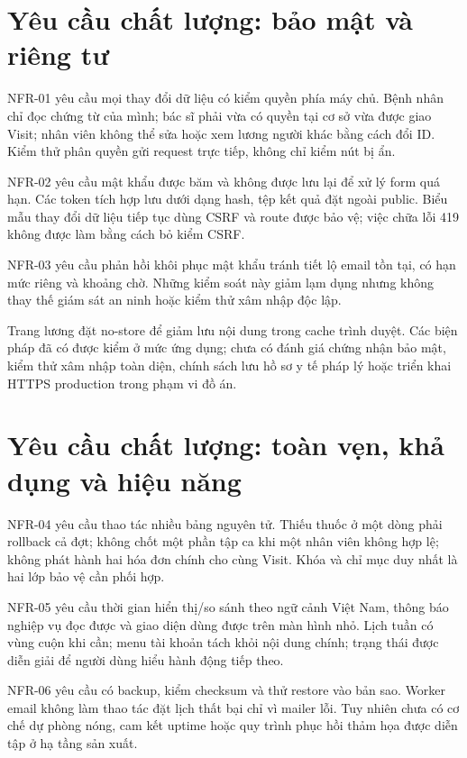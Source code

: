 \section{Yêu cầu chất lượng:\allowbreak{} bảo mật và riêng tư}
NFR-01 yêu cầu mọi thay đổi dữ liệu có kiểm quyền phía máy chủ.\allowbreak{} Bệnh nhân chỉ đọc chứng từ của mình; bác sĩ phải vừa có quyền tại cơ sở vừa được giao Visit; nhân viên không thể sửa hoặc xem lương người khác bằng cách đổi ID.\allowbreak{} Kiểm thử phân quyền gửi request trực tiếp, không chỉ kiểm nút bị ẩn.\allowbreak{}

NFR-02 yêu cầu mật khẩu được băm và không được lưu lại để xử lý form quá hạn.\allowbreak{} Các token tích hợp lưu dưới dạng hash, tệp kết quả đặt ngoài public.\allowbreak{} Biểu mẫu thay đổi dữ liệu tiếp tục dùng CSRF và route được bảo vệ; việc chữa lỗi 419 không được làm bằng cách bỏ kiểm CSRF.\allowbreak{}

NFR-03 yêu cầu phản hồi khôi phục mật khẩu tránh tiết lộ email tồn tại, có hạn mức riêng và khoảng chờ.\allowbreak{} Những kiểm soát này giảm lạm dụng nhưng không thay thế giám sát an ninh hoặc kiểm thử xâm nhập độc lập.\allowbreak{}

Trang lương đặt no-store để giảm lưu nội dung trong cache trình duyệt.\allowbreak{} Các biện pháp đã có được kiểm ở mức ứng dụng; chưa có đánh giá chứng nhận bảo mật, kiểm thử xâm nhập toàn diện, chính sách lưu hồ sơ y tế pháp lý hoặc triển khai HTTPS production trong phạm vi đồ án.\allowbreak{}


\section{Yêu cầu chất lượng:\allowbreak{} toàn vẹn, khả dụng và hiệu năng}
NFR-04 yêu cầu thao tác nhiều bảng nguyên tử.\allowbreak{} Thiếu thuốc ở một dòng phải rollback cả đợt; không chốt một phần tập ca khi một nhân viên không hợp lệ; không phát hành hai hóa đơn chính cho cùng Visit.\allowbreak{} Khóa và chỉ mục duy nhất là hai lớp bảo vệ cần phối hợp.\allowbreak{}

NFR-05 yêu cầu thời gian hiển thị/\allowbreak{}so sánh theo ngữ cảnh Việt Nam, thông báo nghiệp vụ đọc được và giao diện dùng được trên màn hình nhỏ.\allowbreak{} Lịch tuần có vùng cuộn khi cần; menu tài khoản tách khỏi nội dung chính; trạng thái được diễn giải để người dùng hiểu hành động tiếp theo.\allowbreak{}

NFR-06 yêu cầu có backup, kiểm checksum và thử restore vào bản sao.\allowbreak{} Worker email không làm thao tác đặt lịch thất bại chỉ vì mailer lỗi.\allowbreak{} Tuy nhiên chưa có cơ chế dự phòng nóng, cam kết uptime hoặc quy trình phục hồi thảm họa được diễn tập ở hạ tầng sản xuất.\allowbreak{}

